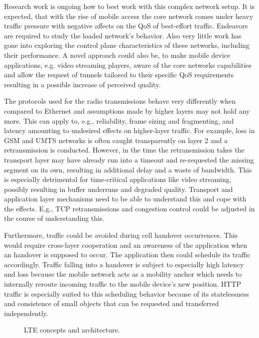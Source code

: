 Research work is ongoing how to best work with this complex network setup. It is expected, that with the rise of mobile access the core network comes under heavy traffic pressure with negative affects on the QoS of best-effort traffic. Endeavors are required to study the loaded network's behavior. Also very little work has gone into exploring the control plane characteristics of these networks, including their performance. A novel approach could also be, to make mobile device applications, e.g. video streaming players, aware of the core networks capabilities and allow the request of tunnels tailored to their specific QoS requirements resulting in a possible increase of perceived quality.


The protocols used for the radio transmissions behave very differently when compared to Ethernet and assumptions made by higher layers may not hold any more. This can apply to, e.g., reliability, frame sizing and fragmenting, and latency amounting to undesired effects on higher-layer traffic. For example, loss in GSM and UMTS networks is often caught transparently on layer 2 and a retransmission is conducted. However, in the time the retransmission takes the transport layer may have already run into a timeout and re-requested the missing segment on its own, resulting in additional delay and a waste of bandwidth. This is especially detrimental for time-critical applications like video streaming, possibly resulting in buffer underruns and degraded quality. Transport and application layer mechanisms need to be able to understand this and cope with the effects. E.g., TCP retransmissions and congestion control could be adjusted in the course of understanding this.

Furthermore, traffic could be avoided during cell handover occurrences. This would require cross-layer cooperation and an awareness of the application when an handover is supposed to occur. The application then could schedule its traffic accordingly. Traffic falling into a handover is subject to especially high latency and loss because the mobile network acts as a mobility anchor which needs to internally reroute incoming traffic to the mobile device's new position. HTTP traffic is especially suited to this scheduling behavior because of its statelessness and consistence of small objects that can be requested and transferred independently.


\begin{figure}
\centering


\caption{LTE concepts and architecture.}
\label{fig:lte}
\end{figure}





